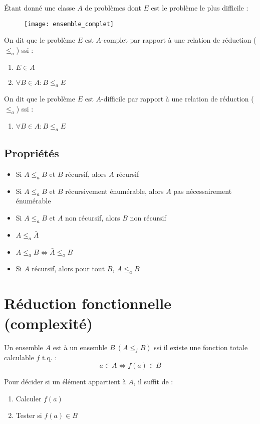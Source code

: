 Étant donné une classe $A$ de problèmes dont $E$ est le problème le plus difficile :
\begin{figure}[H]
    \centering
    \texttt{[image: ensemble\_complet]}
\end{figure}
On dit que le problème $E$ est $A$-complet par rapport à une relation de réduction ($\leq_a$) ssi :
\begin{enumerate}
\item $E \in A$
\item $\forall B \in A : B \leq_a E$
\end{enumerate}
On dit que le problème $E$ est $A$-difficile par rapport à une relation de réduction ($\leq_a$) ssi :
\begin{enumerate}
\item $\forall B \in A : B \leq_a E$
\end{enumerate}

\subsection{Propriétés}

\begin{itemize}
\item Si $A \leq_a B$ et $B$ récursif, alors $A$ récursif
\item Si $A \leq_a B$ et $B$ récursivement énumérable, alors $A$ pas nécessairement énumérable
\item Si $A \leq_a B$ et $A$ non récursif, alors $B$ non récursif
\item $A \leq_a \bar{A}$
\item $A \leq_a B \Leftrightarrow \bar{A} \leq_a B$
\item Si $A$ récursif, alors pour tout $B$, $A \leq_a B$
\end{itemize}

\section{Réduction fonctionnelle (complexité)}

Un ensemble $A$ est  à un ensemble $B \ (A \leq_f B)$ ssi il existe une fonction totale calculable $f$ t.q. :
\begin{equation*}
a \in A \Leftrightarrow f(a) \in B
\end{equation*}

Pour décider si un élément appartient à $A$, il suffit de :
\begin{enumerate}
\item Calculer $f(a)$
\item Tester si $f(a) \in B$
\end{enumerate}

